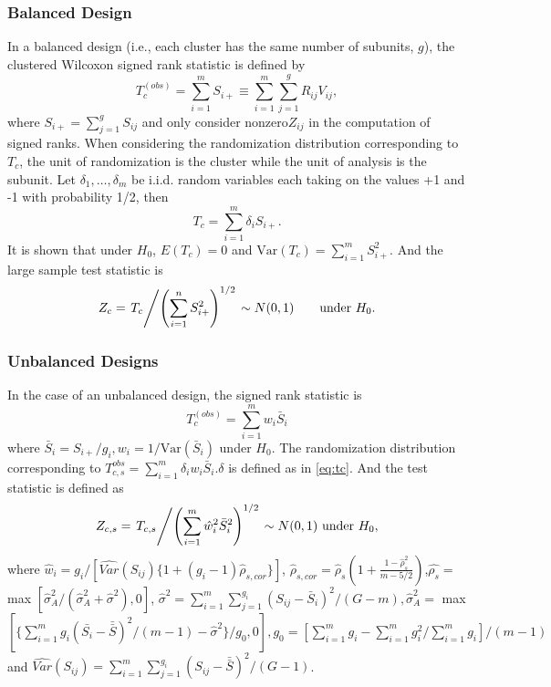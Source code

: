 \documentclass[article]{jss}
\begin{document}
\subsubsection{Balanced Design} \label{bal1}
In a balanced design (i.e., each cluster has the same number of subunits, $g$), the clustered Wilcoxon signed rank statistic is defined by 
\begin{equation}
T_{c}^{(obs)} = \sum_{i=1}^mS_{i+} \equiv \sum^m_{i=1}\sum^g_{j=1}R_{ij}V_{ij},
\end{equation}
where $S_{i+} = \sum_{j=1}^gS_{ij}$ and only consider nonzero$Z_{ij}$ in the computation of signed ranks.
When considering the randomization distribution corresponding to $T_c$, the unit of randomization is the cluster while the unit of analysis is the subunit. Let $\delta_1, \ldots,\delta_m$ be i.i.d. random variables each taking on the values +1 and -1 with probability 1/2, then 
\begin{equation} \label{eq:tc}
T_c = \sum_{i=1}^m\delta_iS_{i+}.
\end{equation}
It is shown that under $H_0$, $E(T_c) = 0$ and $\text{Var}(T_c) = \sum^m_{i=1}S^2_{i+}$.
And the large sample test statistic is 
\begin{equation}
Z_c = \left. T_c \middle/ \left(\sum_{i=1}^nS^2_{i+}\right)^{1/2}\right. \sim N(0, 1)\qquad \text{under } H_0.
\end{equation}
\subsubsection{Unbalanced Designs}
In the case of an unbalanced design, the signed rank statistic is 
\begin{equation}
T_c^{(obs)} = \sum_{i = 1}^m w_i\bar{S}_i  
\end{equation}
where $\bar{S}_i = S_{i+}/{g_i}, w_i = 1/\text{Var}(\bar{S}_i)$ under $H_0$. 
The randomization distribution corresponding to $T_{c,s}^{obs} = \sum^m_{i=1}\delta_iw_i\bar{S}_i$.$\delta$ is defined as in \eqref{eq:tc}.
And the test statistic is defined as 
\begin{equation}
Z_{c,s} = \left.T_{c,s}\middle/ \left(\sum_{i=1}^m\hat{w}^2_i\bar{S}^2_i\right)^{1/2}\right. \sim N(0,1) \text{ under }H_0,
\end{equation}
where $\hat{w}_i = g_i/[\widehat{Var}(S_{ij})\{1 + (g_i-1)\hat{\rho}_{s,cor}\}]$, $\hat{\rho}_{s,cor} = \hat{\rho}_s\left(1 + \frac{1 - \hat{\rho}_s^2}{m - 5/2}\right)$,$\hat{\rho_s} = $ max $[\hat{\sigma}_A^2/(\hat{\sigma}_A^2 + \hat{\sigma}^2), 0]$, $\hat{\sigma
}^2 = \sum_{i=1}^m\sum_{j=1}^{g_i}(S_{ij} - \bar{S}_i)^2/(G-m), \hat{\sigma}^2_A = $ max $[\{\sum_{i=1}^mg_i(\bar{S_i}- \bar{\bar{S}})^2/(m-1)- \hat{\sigma}^2\}/g_0,0], g_0 = [\sum_{i=1}^mg_i - \sum_{i=1}^mg_i^2/\sum_{i=1}^mg_i]/(m-1)$ and $\widehat{Var}(S_{ij}) = \sum_{i=1}^m\sum_{j=1}^{g_i}(S_{ij} - \bar{\bar{S}})^2/(G-1)$.
\end{document}
